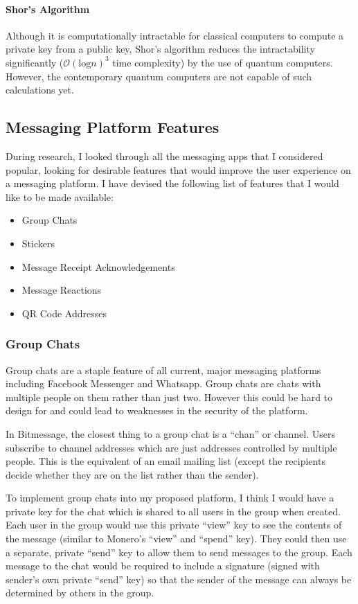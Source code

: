 \documentclass{article}
\begin{document}
\paragraph{Shor's Algorithm}
Although it is computationally intractable for classical computers to compute a private key from a public key, Shor's algorithm reduces the intractability significantly ($\mathcal O(\textrm{log} n)^3$ time complexity) by the use of quantum computers. However, the contemporary quantum computers are not capable of such calculations yet.

\subsection{Messaging Platform Features}
During research, I looked through all the messaging apps that I considered popular, looking for desirable features that would improve the user experience on a messaging platform. I have devised the following list of features that I would like to be made available:
\begin{itemize}
    \item Group Chats
    \item Stickers
    \item Message Receipt Acknowledgements
    \item Message Reactions
    \item QR Code Addresses
\end{itemize}

\subsubsection{Group Chats}
Group chats are a staple feature of all current, major messaging platforms including Facebook Messenger and Whatsapp. Group chats are chats with multiple people on them rather than just two. However this could be hard to design for and could lead to weaknesses in the security of the platform.

In Bitmessage, the closest thing to a group chat is a ``chan'' or channel. Users subscribe to channel addresses which are just addresses controlled by multiple people. This is the equivalent of an email mailing list (except the recipients decide whether they are on the list rather than the sender).

To implement group chats into my proposed platform, I think I would have a private key for the chat which is shared to all users in the group when created. Each user in the group would use this private ``view'' key to see the contents of the message (similar to Monero's ``view'' and ``spend'' key). They could then use a separate, private ``send'' key to allow them to send messages to the group. Each message to the chat would be required to include a signature (signed with sender's own private ``send'' key) so that the sender of the message can always be determined by others in the group.
\end{document}
